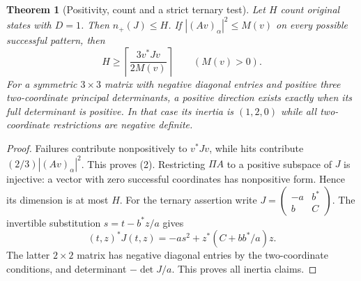 \documentclass[10pt,a4paper]{article}
\newtheorem{theorem}{Theorem}
\begin{document}
\begin{theorem}[Positivity, count and a strict ternary test]
Let $H$ count original states with $D=1$. Then $n_+(J)\le H$.
If $|(Av)_\alpha|^2\le M(v)$ on every possible successful pattern, then
\[
 H\ge\left\lceil\frac{3v^*Jv}{2M(v)}\right\rceil\qquad(M(v)>0).
 \tag{2}
\]
For a symmetric $3\times3$ matrix with negative diagonal entries and positive
three two-coordinate principal determinants, a positive direction exists
exactly when its full determinant is positive. In that case its inertia is
$(1,2,0)$ while all two-coordinate restrictions are negative definite.
\end{theorem}
\begin{proof}
Failures contribute nonpositively to $v^*Jv$, while hits contribute
$(2/3)|(Av)_\alpha|^2$. This proves (2). Restricting $\Pi A$ to a positive
subspace of $J$ is injective: a vector with zero successful coordinates has
nonpositive form. Hence its dimension is at most $H$.
For the ternary assertion write $J=\left(\begin{smallmatrix}-a&b^*\\b&C\end{smallmatrix}\right)$.
The invertible substitution $s=t-b^*z/a$ gives
\[
 (t,z)^*J(t,z)=-a s^2+z^*(C+bb^*/a)z.
 \tag{3}
\]
The latter $2\times2$ matrix has negative diagonal entries by the two-coordinate
conditions, and determinant $-\det J/a$. This proves all inertia claims.
\end{proof}

\newpage
\end{document}
